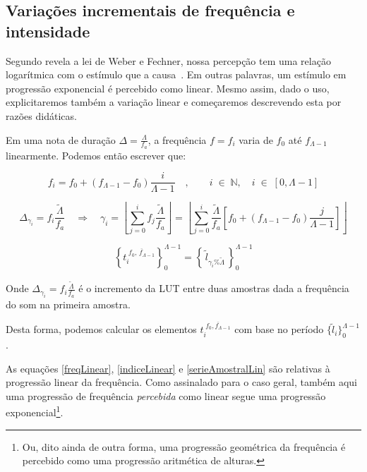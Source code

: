 \subsection{Variações incrementais de frequência e intensidade}

Segundo revela a lei de Weber e Fechner, nossa percepção tem uma relação logarítmica com
o estímulo que a causa~\cite{Weber-Fechner}. Em outras palavras, um estímulo em progressão exponencial
é percebido como linear. Mesmo assim, dado o uso, explicitaremos também a variação
linear e começaremos descrevendo esta por razões didáticas.

Em uma nota de duração $\Delta = \frac{\Lambda}{f_a}$, a frequência $f=f_i$ varia de $f_0$ até $f_{\Lambda -1}$
linearmente. Podemos então escrever que:

\begin{equation}\label{freqLinear}
f_i=f_0 + (f_{\Lambda-1}-f_0)\frac{i}{\Lambda-1} \quad ,\quad \quad i \;\in\; \mathbb{N}, \quad i \;\in\; [0,\Lambda-1]
\end{equation}

\begin{equation}\label{indiceLinear}
\Delta_{\gamma_i}=f_i\frac{\widetilde{\Lambda}}{f_a} \quad \Rightarrow \quad \gamma_i=\left \lfloor \sum_{j=0}^{i} f_j\frac{\widetilde{\Lambda}}{f_a} \right \rfloor   =\left \lfloor \sum_{j=0}^{i} \frac{\widetilde{\Lambda}}{f_a} \left [f_0 + (f_{\Lambda-1}-f_0)\frac{j}{\Lambda-1} \right ] \right \rfloor 
\end{equation}

\begin{equation}\label{serieAmostralLin}
\left\{t_i^{\;\overline{f_0,\, f_{\Lambda-1}}}\right\}_0^{\Lambda-1}=\left\{\,\widetilde{l}_{\gamma_i \% \widetilde{\Lambda}}\,\right\}_0^{\Lambda-1}
\end{equation}

Onde $\Delta_{\gamma_i}=f_i\frac{\widetilde{\Lambda}}{f_a}$ é o incremento da LUT entre duas amostras dada a frequência do som na primeira amostra.

Desta forma, podemos calcular os elementos $t_i^{\;\overline{f_0,f_{\Lambda-1}}}$
com base no período $\{\widetilde{l}_i\}_0^{\Lambda-1}$.

As equações \ref{freqLinear}, \ref{indiceLinear} e \ref{serieAmostralLin} são relativas à progressão linear
da frequência. Como assinalado para o caso geral, também aqui
uma progressão de frequência
\emph{percebida} como linear segue uma progressão exponencial\footnote{Ou,
dito ainda de outra forma, uma progressão geométrica da frequência
é percebido como uma progressão aritmética de alturas.}.

